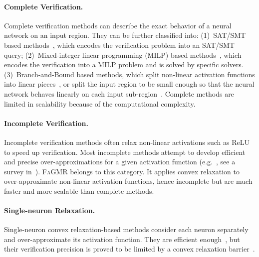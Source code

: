 \documentclass[runningheads]{llncs}
\newcommand{\ourtool}{\textsc{FaGMR}\xspace}
\begin{document}
\paragraph{Complete Verification.}
Complete verification methods can describe the exact behavior
of a neural network on an input region. They can be further
classified into: (1)~SAT/SMT based
methods~\cite{DBLP:conf/cav/KatzBDJK17,DBLP:conf/cav/KatzHIJLLSTWZDK19,DBLP:conf/atva/Ehlers17},
which encodes the verification problem into an SAT/SMT query;
(2)~Mixed-integer linear programming (MILP) based
methods~\cite{DBLP:conf/atva/Ehlers17,DBLP:journals/mp/AndersonHMTV20,DBLP:conf/aaai/BotoevaKKLM20},
which encodes the verification into a MILP problem and is solved by specific solvers.
(3)~Branch-and-Bound based methods, which split non-linear
activation functions into linear
pieces~\cite{DBLP:conf/iclr/XuZ0WJLH21,DBLP:conf/nips/WangPWYJ18,DBLP:journals/jmlr/BunelLTTKK20,NEURIPS2021_fac7fead},
or split the input region to be small enough so that the neural
network behaves linearly on each input
sub-region~\cite{DBLP:conf/uss/WangPWYJ18}.
Complete methods are
limited in scalability because of the computational complexity.

\paragraph{Incomplete Verification.}
Incomplete verification methods often relax non-linear activations such as
ReLU to speed up verification.
Most incomplete methods attempt to develop efficient and precise
over-approximations for a given activation function
(e.g.~\cite{NEURIPS2018_f2f44698,DBLP:journals/pacmpl/SinghGPV19,DBLP:conf/nips/ZhangWCHD18,DBLP:conf/nips/SalmanY0HZ19,DBLP:conf/iclr/XuZ0WJLH21,Zheng2022},
see a survey in~\cite{DBLP:journals/ftopt/LiuALSBK21}).  
\ourtool belongs to this category. It applies convex relaxation 
to over-approximate non-linear
activation functions, hence incomplete but are much faster and more
scalable than complete methods.

\paragraph{Single-neuron Relaxation.}

Single-neuron
convex relaxation-based methods consider each neuron separately
and over-approximate its activation function.
They are efficient enough~\cite{NEURIPS2018_f2f44698,DBLP:journals/pacmpl/SinghGPV19,DBLP:conf/nips/ZhangWCHD18,DBLP:conf/nips/SalmanY0HZ19,DBLP:conf/iclr/XuZ0WJLH21,Zheng2022,zhao2022cleverest,goubault2021static},
but their verification precision is proved to be limited by a
convex relaxation barrier~\cite{DBLP:conf/nips/SalmanY0HZ19}.
\end{document}
